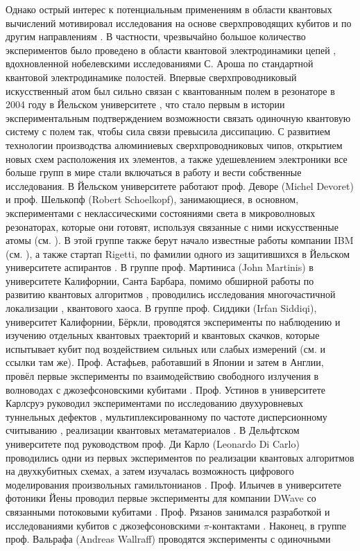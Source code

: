 \documentclass[14pt, a4paper]{extreport}
\numberwithin{equation}{section}
\begin{document}
Однако острый интерес к потенциальным применениям в области квантовых вычислений мотивировал исследования на основе сверхпроводящих кубитов и по другим направлениям \cite{kjaergaard2020superconducting}. В частности, чрезвычайно большое количество экспериментов было проведено в области квантовой электродинамики цепей \cite{blais2020quantum}, вдохновленной нобелевскими исследованиями С. Ароша \cite{haroche2013nobel} по стандартной квантовой электродинамике полостей. Впервые сверхпроводниковый искусственный атом был сильно связан с квантованным полем в резонаторе в 2004 году в Йельском университете \cite{wallraff2004strong}, что стало первым в истории экспериментальным подтверждением возможности связать одиночную квантовую систему с полем так, чтобы сила связи превысила диссипацию. С развитием технологии производства алюминиевых сверхпроводниковых чипов, открытием новых схем расположения их элементов, а также удешевлением электроники все больше групп в мире стали включаться в работу и вести собственные исследования. В Йельском университете работают проф. Деворе (Michel Devoret) и проф. Шелькопф (Robert Schoelkopf), занимающиеся, в основном, экспериментами с неклассическими состояниями света в микроволновых резонаторах, которые они готовят, используя связанные с ними искусственные атомы (см. \cite{vlastakis2013deterministically, mirrahimi2014dynamically}). В этой группе также берут начало известные работы компании IBM (см. \cite{jurcevic2020demonstration}), а также стартап Rigetti, по фамилии одного из защитившихся в Йельском университете аспирантов \cite{reagor2018demonstration}. В группе проф. Мартиниса (John Martinis) в университете Калифорнии, Санта Барбара, помимо обширной работы по развитию квантовых алгоритмов \cite{arute2019quantum}, проводились исследования многочастичной локализации \cite{chen2014emulating, roushan2017spectroscopic}, квантового хаоса. В группе проф. Сиддики (Irfan Siddiqi), университет Калифорнии, Бёркли, проводятся эксперименты по наблюдению и изучению отдельных квантовых траекторий и квантовых скачков, которые испытывает кубит под воздействием сильных или слабых измерений (см. \cite{hacohen2016quantum} и ссылки там же). Проф. Астафьев, работавший в Японии и затем в Англии, провёл первые эксперименты по взаимодействию свободного излучения в волноводах с джозефсоновскими кубитами \cite{astafiev2010resonance}. Проф. Устинов в университете Карлсруэ руководил экспериментами по исследованию двухуровневых туннельных дефектов \cite{grabovskij2012strain}, мультиплексированному по частоте дисперсионному считыванию \cite{jerger2012frequency}, реализации квантовых метаматериалов \cite{macha2014implementation}. В Дельфтском университете под руководством проф. Ди Карло (Leonardo Di Carlo) проводились одни из первых экспериментов по реализации квантовых алгоритмов на двухкубитных схемах, а затем изучалась возможность цифрового моделирования произвольных гамильтонианов \cite{langford2017experimentally}. Проф. Ильичев в университете фотоники Йены проводил первые эксперименты для компании DWave со связанными потоковыми кубитами \cite{grajcar2006four}. Проф. Рязанов занимался разработкой и исследованиями кубитов с джозефсоновскими $\pi$-контактами \cite{feofanov2010implementation}. Наконец, в группе проф. Вальрафа (Andreas Wallraff) проводятся эксперименты с одиночными 
\end{document}
